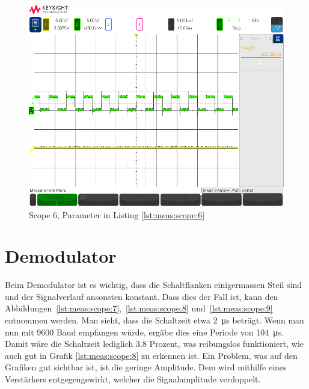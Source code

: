 \begin{figure}[h!tb]
    \centering
    \includegraphics[width=1\textwidth, trim=0mm 21mm 0mm 11mm, clip]{images/scopeShots/scope_6b.png}
    \caption{Scope 6, Parameter in Listing \ref{lst:meas:scope:6}}
    \label{fig:meas:scope:6}
\end{figure}


\section{Demodulator}
\label{sec:val:demodulator}

Beim  Demodulator  ist  es   wichtig,  dass  die  Schaltflanken  einigermassen
Steil  sind  und   der  Signalverlauf  ansonsten  konstant.    Dass  dies  der
Fall ist,  kann den Abbildungen~\ref{lst:meas:scope:7},~\ref{lst:meas:scope:8}
und~\ref{lst:meas:scope:9} entnommen  werden.  Man sieht, dass  die Schaltzeit
etwa  \SI{2}{\micro\second} betr\"agt. Wenn  man nun  mit 9600  Baud empfangen
w\"urde,  erg\"abe dies  eine  Periode  von \SI{104}{\micro\second}.   Damit
w\"are die Schaltzeit lediglich 3.8 Prozent, was reibungslos funktioniert, wie
auch gut in  Grafik \ref{lst:meas:scope:8} zu erkennen ist.   Ein Problem, was
auf  den  Grafiken gut  sichtbar  ist,  ist  die geringe  Amplitude. Dem  wird
mithilfe  eines  Verst\"arkers  entgegengewirkt, welcher  die  Signalamplitude
verdoppelt.

